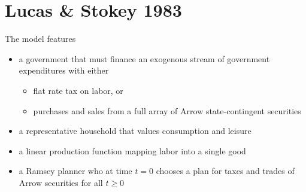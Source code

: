 \documentclass{article} %
\begin{document}
\section{Lucas \& Stokey 1983}
The model features
\begin{itemize}
  \item a government that must finance an exogenous stream of
    government expenditures with either
    \begin{itemize}
     \item  flat rate tax on labor, or
     \item purchases and sales from a full array of Arrow
        state-contingent securities
    \end{itemize}
  \item a representative household that values consumption and leisure
    \item a linear production function mapping labor into a single
      good
    \item a Ramsey planner who at time $t=0$ chooses a plan for
        taxes and trades of Arrow securities for all $t \geq 0$
 \end{itemize}
\end{document}
